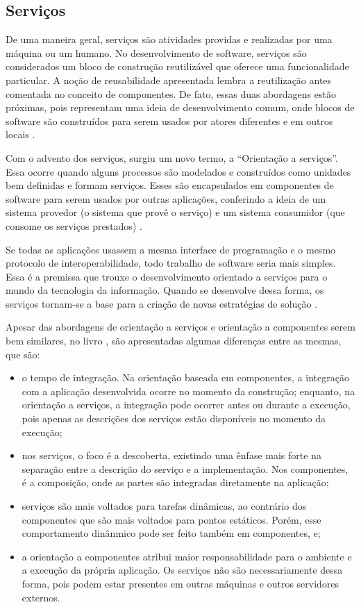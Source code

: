 \begin{apendicesenv}
\section{Serviços}
\label{sec:servicos}

De uma maneira geral, serviços são atividades providas e realizadas por uma máquina ou um humano. No desenvolvimento de software, serviços são considerados um bloco de construção reutilizável que oferece uma funcionalidade particular. A noção de reusabilidade apresentada lembra a reutilização antes comentada no conceito de componentes. De fato, essas duas abordagens estão próximas, pois representam uma ideia de desenvolvimento comum, onde blocos de software são construídos para serem usados por atores diferentes e em outros locais \cite{Stojanovic:Dahanayake:2005}.

Com o advento dos serviços, surgiu um novo termo, a ``Orientação a serviços''. Essa ocorre quando alguns processos são modelados e construídos como unidades bem definidas e formam serviços. Esses são encapsulados em componentes de software para serem usados por outras aplicações, conferindo a ideia de um sistema provedor (o sistema que provê o serviço) e um sistema consumidor (que consome os serviços prestados) \cite{Victorino:Brascher:2009}.

Se todas as aplicações usassem a mesma interface de programação e o mesmo protocolo de interoperabilidade, todo trabalho de software seria mais simples. Essa é a premissa que trouxe o desenvolvimento orientado a serviços para o mundo da tecnologia da informação. Quando se desenvolve dessa forma, os serviços tornam-se a base para a criação de novas estratégias de solução \cite{Newcomer:Lomow:2004}.

Apesar das abordagens de orientação a serviços e orientação a componentes serem bem similares, no livro \cite{Stojanovic:Dahanayake:2005}, são apresentadas algumas diferenças entre as mesmas, que são:

\begin{itemize}
	\item o tempo de integração. Na orientação baseada em componentes, a integração com a aplicação desenvolvida ocorre no momento da construção; enquanto, na orientação a serviços, a integração pode ocorrer antes ou durante a execução, pois apenas as descrições dos serviços estão disponíveis no momento da execução;
	\item nos serviços, o foco é a descoberta, existindo uma ênfase mais forte na separação entre a descrição do serviço e a implementação. Nos componentes, é a composição, onde as partes são integradas diretamente na aplicação;
	\item serviços são mais voltados para tarefas dinâmicas, ao contrário dos componentes que são mais voltados para pontos estáticos. Porém, esse comportamento dinânmico pode ser feito também em componentes, e;
	\item a orientação a componentes atribui maior responsabilidade para o ambiente e a execução da própria aplicação. Os serviços não são necessariamente dessa forma, pois podem estar presentes em outras máquinas e outros servidores externos.
\end{itemize}


\end{apendicesenv}

